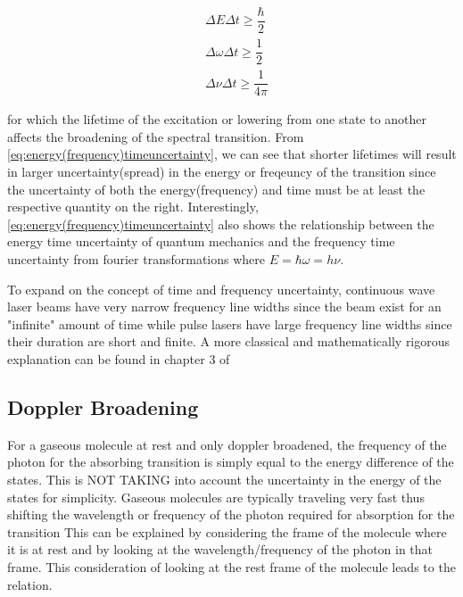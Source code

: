 \documentclass[11pt,a4paper]{book}
\begin{document}
\begin{equation}
\label{eq:energy(frequency)timeuncertainty}
\begin{split}
&\Delta E \Delta t \geq \dfrac{\hbar}{2} \\
&\Delta \omega \Delta t \geq \dfrac{1}{2} \\
&\Delta \nu \Delta t \geq \dfrac{1}{4 \pi}
\end{split}
\end{equation}

\noindent
for which the lifetime of the excitation or lowering from one state to another affects the broadening of the spectral transition. From \autoref{eq:energy(frequency)timeuncertainty}, we can see that shorter lifetimes will result in larger uncertainty(spread) in the energy or freqeuncy of the transition since the uncertainty of both the energy(frequency) and time must be at least the respective quantity on the right. Interestingly, \autoref{eq:energy(frequency)timeuncertainty} also shows the relationship between the energy time uncertainty of quantum mechanics and the frequency time uncertainty from fourier transformations where $E=\hbar \omega =h \nu$. 

To expand on the concept of time and frequency uncertainty, continuous wave laser beams have very narrow frequency line widths since the beam exist for an "infinite" amount of time while pulse lasers have large frequency line widths since their duration are short and finite. A more classical and mathematically rigorous explanation can be found in chapter 3 of \cite{LaserSpec1}

\subsection{Doppler Broadening}
\label{subsec:Doppler Broadening}
For a gaseous molecule at rest and only doppler broadened, the frequency of the photon for the absorbing transition is simply equal to the energy difference of the states. 
This is NOT TAKING into account the uncertainty in the energy of the states for simplicity.
Gaseous molecules are typically traveling very fast thus shifting the wavelength or frequency of the photon required for absorption for the transition
This can be explained by considering the frame of the molecule where it is at rest and by looking at the wavelength/frequency of the photon in that frame. 
This consideration of looking at the rest frame of the molecule leads to the relation.
\end{document}
